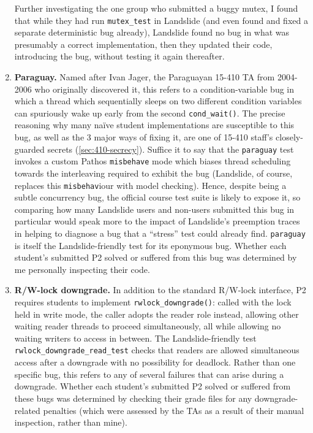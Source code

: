 \begin{enumerate}
Further investigating the one group who submitted a buggy mutex,
I found that while they had run {\tt mutex\_test} in Landslide
(and even found and fixed a separate deterministic bug already),
Landslide found no bug in what was presumably a correct implementation,
then they updated %
their code, introducing the bug, without testing it again thereafter.

\item
{\bf Paraguay.}
Named after Ivan Jager, the Paraguayan 15-410 TA from 2004-2006 who originally discovered it,
this refers to a condition-variable bug in which a thread which sequentially sleeps on two different condition variables
can spuriously wake up early from the second {\tt cond\_wait()}.
The precise reasoning why many na\"ive student implementations are susceptible to this bug,
as well as the 3 major ways of fixing it,
are one of 15-410 staff's closely-guarded secrets (\cref{sec:410-secrecy}).
Suffice it to say that the {\tt paraguay} test invokes a custom Pathos {\tt misbehave} mode
which biases thread scheduling towards the interleaving required to exhibit the bug
(Landslide, of course, replaces this {\tt misbehav}iour with model checking).
Hence, despite being a subtle concurrency bug,
the official course test suite is likely to expose it,
so comparing how many Landslide users and non-users submitted this bug in particular
would speak more to the impact of Landslide's preemption traces
in helping to diagnose a bug that a ``stress'' test could already find.
%
{\tt paraguay} is itself the Landslide-friendly test for its eponymous bug.
Whether each student's submitted P2 solved or suffered from this bug
was determined by me personally inspecting their code.

\item
{\bf R/W-lock downgrade.}
In addition to the standard R/W-lock interface,
P2 requires students to implement {\tt rwlock\_downgrade()}:
called with the lock held in write mode,
the caller adopts the reader role instead,
allowing other waiting reader threads to proceed simultaneously,
all while allowing no waiting writers to access in between.
%
The Landslide-friendly test {\tt rwlock\_downgrade\_read\_test}
checks that readers are allowed simultaneous access after a downgrade with no possibility for deadlock.
Rather than one specific bug, this refers to any of several failures that can arise during a downgrade.
Whether each student's submitted P2 solved or suffered from these bugs
was determined by checking their grade files for any downgrade-related penalties
(which were assessed by the TAs as a result of their manual inspection, rather than mine).
\end{enumerate}

